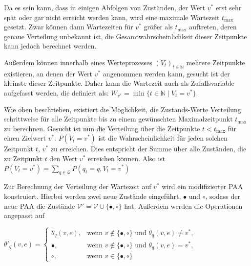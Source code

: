 Da es sein kann, dass in einigen Abfolgen von Zuständen, der Wert $v^*$ erst sehr spät oder gar nicht erreicht werden kann, wird eine maximale Wartezeit $t_{\text{max}}$ gesetzt. Zwar können dann Wartezeiten für $v^*$ größer als $t_{\text{max}}$ auftreten, deren genaue Verteilung unbekannt ist, die Gesamtwahrscheinlichkeit dieser Zeitpunkte kann jedoch berechnet werden.


Außerdem können innerhalb eines Werteprozesses $(V_t)_{t\in\mathbb{N}}$ mehrere Zeitpunkte existieren, an denen der Wert $v^*$ angenommen werden kann, gesucht ist der kleinste dieser Zeitpunkte. %
Daher kann die Wartezeit auch als Zufallsvariable aufgefasst werden, die definiert als: $W_{v^*} = \min\{t \in \mathbb{N}\mid V_t = v^*\}$.

Wie oben beschrieben, existiert die Möglichkeit, die Zustands-Werte Verteilung schrittweise für alle Zeitpunkte bis zu einem gewünschten Maximalzeitpunkt $t_{\text{max}}$ zu berechnen.
Gesucht ist nun die Verteilung über die Zeitpunkte $t < t_{\text{max}}$ für einen Zielwert $v^*$. $P(V_{t} = v^*)$ ist die Wahrscheinlichkeit für jeden solchen Zeitpunkt $t$, $v^*$  zu erreichen. Dies entspricht der Summe über alle Zuständen, die zu Zeitpunkt $t$ den Wert $v^*$ erreichen können. Also ist $P(V_t = v^*)  = \sum_{q \in \mathcal{Q}} P(q_{t} = q, V_{t} = v^*)$


Zur Berechnung der Verteilung der Wartezeit auf $v^*$ wird ein modifizierter PAA konstruiert. Hierbei werden zwei neue Zustände eingeführt, $\bullet$ und $\circ$, sodass der neue PAA die Zustände $\mathcal{V}' = \mathcal{V} \cup \{\bullet, \circ\}$ hat. Außerdem werden die Operationen angepasst auf

$ \theta'_q(v,e)=
\begin{cases}
\theta_q(v,e), 	& \text{wenn } v \notin \{\bullet, \circ\} \text{ und } \theta_q(v,e) \neq v^* ,\\
\bullet,	& \text{wenn } v \notin \{\bullet, \circ\} \text{ und } \theta_q(v,e) = v^* ,\\
\circ, 		& \text{wenn } v \in \{\bullet, \circ\}
\end{cases}$

